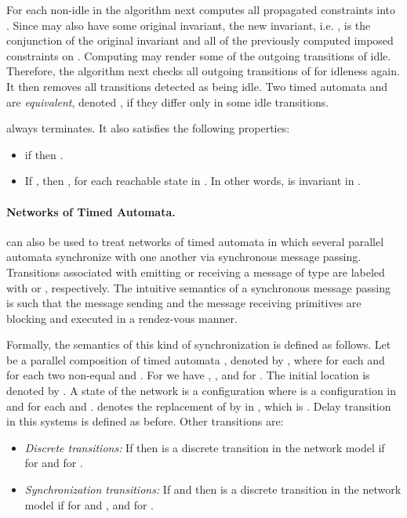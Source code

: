 \documentclass{eptcs}
\begin{document}
For each non-idle  in  the algorithm next computes all
propagated constraints into .  Since  may also have some original
invariant, the new invariant, i.e. , is the conjunction of the
original invariant and all of the previously computed imposed constraints on
.  Computing  may render some of the outgoing transitions of
 idle.  Therefore, the algorithm next checks all outgoing transitions of
 for idleness again.  It then removes all transitions detected as being
idle.
Two timed automata  and  are {\em equivalent}, denoted ,
if they differ only in some idle transitions.
\begin{theorem}
\label{theo.inv}
 always terminates. It also satisfies the following properties:
\begin{itemize} 
\item if  then .
\item If , then , for each reachable
  state  in .  In other words,  is invariant in .
\end{itemize}
\end{theorem}



\paragraph{Networks of Timed Automata.}

 can also be used to treat networks of timed automata in which several
parallel automata synchronize with one another via synchronous message passing.
Transitions associated with emitting or receiving a message of type  are labeled
with  or , respectively. 
The intuitive semantics of a synchronous message passing is such that the message sending and the 
message receiving primitives are blocking and executed in a rendez-vous manner.

Formally, the semantics of this kind of synchronization is defined as follows.
Let  be a parallel composition of 
timed automata , denoted by , where
 for each  and
for each two non-equal  and  .  For  we have
, ,
and  for . The initial location is denoted by .
A state of the network is a configuration  where
  is a configuration in  and  for each  and .
 denotes the replacement of  by  in ,
which is .
Delay transition in this systems is defined as before. Other transitions are:
\begin{itemize}
\item {\em Discrete transitions:} If 
 then  is a discrete
transition in the network model if  for  and
 for .
\item {\em Synchronization transitions:} If 
 and   
then  is a discrete
transition in the network model if  for  and , and
 for .
\end{itemize}
\end{document}
